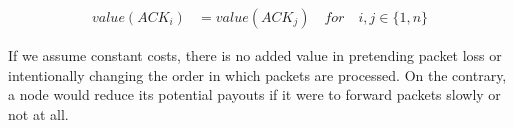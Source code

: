 \begin{align}
    value ( ACK_i ) & =value ( ACK_j ) \quad for \quad i,j\in \{1,n\}
\end{align}

If we assume constant costs, there is no added value in pretending packet loss or intentionally changing the order in which packets are processed. On the contrary, a node would reduce its potential payouts if it were to forward packets slowly or not at all.